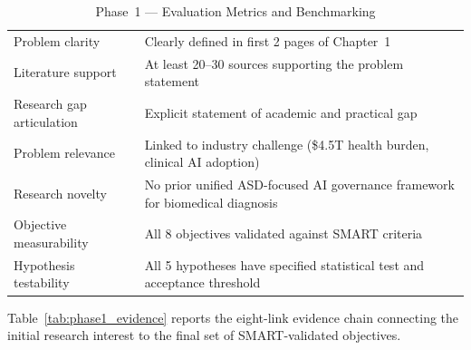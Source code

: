 \begingroup\singlespacing\tablefontsize\tablestripes
\begin{xltabular}{\textwidth}{@{} p{3.2cm} X @{}}
\caption{Phase~1 --- Evaluation Metrics and Benchmarking}
\label{tab:phase1_benchmark}\\
\toprule
{} &  \\
\midrule
\endfirsthead
\endhead
\bottomrule
\endlastfoot
Problem clarity              & Clearly defined in first 2 pages of Chapter~1 \\
\addlinespace
Literature support           & At least 20--30 sources supporting the problem statement \\
\addlinespace
Research gap articulation    & Explicit statement of academic and practical gap \\
\addlinespace
Problem relevance            & Linked to industry challenge (\$4.5T health burden, clinical AI adoption) \\
\addlinespace
Research novelty             & No prior unified ASD-focused AI governance framework for biomedical diagnosis \\
\addlinespace
Objective measurability      & All 8 objectives validated against SMART criteria \\
\addlinespace
Hypothesis testability       & All 5 hypotheses have specified statistical test and acceptance threshold \\
\end{xltabular}
\endgroup

\vspace{1.5em}

Table~\ref{tab:phase1_evidence} reports the eight-link evidence chain connecting the initial research interest to the final set of SMART-validated objectives.


